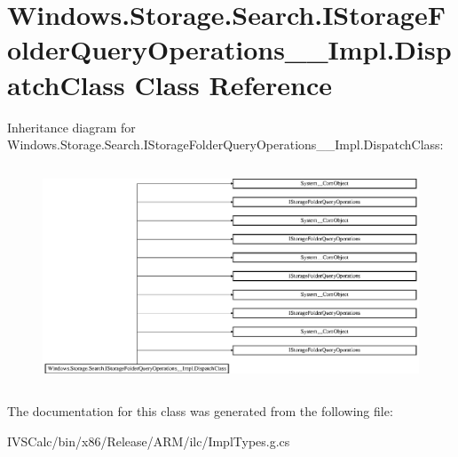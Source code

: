 \hypertarget{class_windows_1_1_storage_1_1_search_1_1_i_storage_folder_query_operations_____impl_1_1_dispatch_class}{}\section{Windows.\+Storage.\+Search.\+I\+Storage\+Folder\+Query\+Operations\+\_\+\+\_\+\+Impl.\+Dispatch\+Class Class Reference}
\label{class_windows_1_1_storage_1_1_search_1_1_i_storage_folder_query_operations_____impl_1_1_dispatch_class}
Inheritance diagram for Windows.\+Storage.\+Search.\+I\+Storage\+Folder\+Query\+Operations\+\_\+\+\_\+\+Impl.\+Dispatch\+Class\+:\begin{figure}[H]
\begin{center}
\leavevmode
\includegraphics[height=6.567164cm]{class_windows_1_1_storage_1_1_search_1_1_i_storage_folder_query_operations_____impl_1_1_dispatch_class}
\end{center}
\end{figure}


The documentation for this class was generated from the following file\+:\begin{DoxyCompactItemize}
\item 
I\+V\+S\+Calc/bin/x86/\+Release/\+A\+R\+M/ilc/Impl\+Types.\+g.\+cs\end{DoxyCompactItemize}
